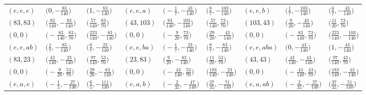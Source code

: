\documentclass[pdftex]{sigma}
\theoremstyle{definition}
\numberwithin{equation}{section}
\begin{document}
\begin{landscape}
\begin{table}[th]\centering\small
 \begin{tabular}{|lll|lll|lll|}
 \hline
$(e, e, e)$ & $\bigl(0, -\frac{83}{140}\bigr)$ & $\bigl(1, -\frac{83}{140}\bigr)$ & $(e, e, a)$ & $\bigl(-\frac{1}{7}, -\frac{43}{140}\bigr)$ & $\bigl(\frac{8}{7}, -\frac{103}{140}\bigr)$ & $(e, e, b)$ & $\bigl(\frac{1}{7}, -\frac{103}{140}\bigr)$ & $\bigl(\frac{6}{7}, -\frac{43}{140}\bigr)$
\\
$(83, 83)$ & $\bigl(\frac{83}{140}, -\frac{83}{140}\bigr)$ & $\bigl(\frac{57}{140}, \frac{83}{70}\bigr)$ & $(43, 103)$ & $\bigl(\frac{83}{140}, -\frac{103}{140}\bigr)$ & $\bigl(\frac{57}{140}, \frac{73}{70}\bigr)$ & $(103, 43)$ & $\bigl(\frac{9}{20}, -\frac{43}{140}\bigr)$ & $\bigl(\frac{11}{20}, \frac{73}{70}\bigr)$
\\
$(0, 0)$ & $\bigl(-\frac{83}{140}, \frac{83}{70}\bigr)$ & $\bigl(\frac{223}{140}, -\frac{83}{140}\bigr)$ & $(0, 0)$ & $\bigl(-\frac{9}{20}, \frac{73}{70}\bigr)$ & $\bigl(\frac{29}{20}, -\frac{43}{140}\bigr)$ & $(0, 0)$ & $\bigl(-\frac{83}{140}, \frac{73}{70}\bigr)$ & $\bigl(\frac{223}{140}, -\frac{103}{140}\bigr)$ \\\hline
$(e, e, ab)$ & $\bigl(\frac{1}{7}, -\frac{83}{140}\bigr)$ & $\bigl(\frac{6}{7}, -\frac{23}{140}\bigr)$ & $(e, e, ba)$ & $\bigl(-\frac{1}{7}, -\frac{23}{140}\bigr)$ & $\bigl(\frac{8}{7}, -\frac{83}{140}\bigr)$ & $(e, e, aba)$ & $\bigl(0, -\frac{43}{140}\bigr)$ & $\bigl(1, -\frac{43}{140}\bigr)$
\\
$(83, 23)$ & $\bigl(\frac{43}{140}, -\frac{23}{140}\bigr)$ & $\bigl(\frac{97}{140}, \frac{53}{70}\bigr)$ & $(23, 83)$ & $\bigl(\frac{9}{20}, -\frac{83}{140}\bigr)$ & $\bigl(\frac{11}{20}, \frac{53}{70}\bigr)$ & $(43, 43)$ & $\bigl(\frac{43}{140}, -\frac{43}{140}\bigr)$ & $\bigl(\frac{97}{140}, \frac{43}{70}\bigr)$
\\
$(0, 0)$ & $\bigl(-\frac{9}{20}, \frac{53}{70}\bigr)$ & $\bigl(\frac{29}{20}, -\frac{83}{140}\bigr)$ & $(0, 0)$ & $\bigl(-\frac{43}{140}, \frac{53}{70}\bigr)$ & $\bigl(\frac{183}{140}, -\frac{23}{140}\bigr)$ & $(0, 0)$ & $\bigl(-\frac{43}{140}, \frac{43}{70}\bigr)$ & $\bigl(\frac{183}{140}, -\frac{43}{140}\bigr)$ \\\hline
$(e, a, e)$ & $\bigl(-\frac{1}{5}, -\frac{27}{140}\bigr)$ & $\bigl(\frac{6}{5}, -\frac{111}{140}\bigr)$ & $(e, a, b)$ & $\bigl(-\frac{2}{35}, -\frac{47}{140}\bigr)$ & $\bigl(\frac{37}{35}, -\frac{71}{140}\bigr)$ & $(e, a, ab)$ & $\bigl(-\frac{2}{35}, -\frac{27}{140}\bigr)$ & $\bigl(\frac{37}{35}, -\frac{51}{140}\bigr)$

\end{tabular}
\end{table}
\end{landscape}
\end{document}

